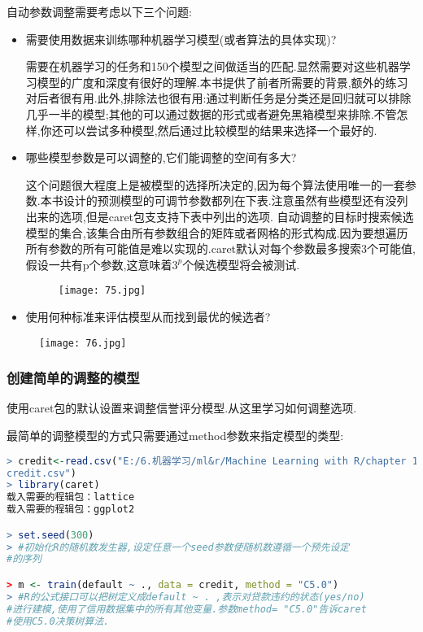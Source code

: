 \documentclass[11pt,a4paper,oneside]{book}
\begin{document}
自动参数调整需要考虑以下三个问题:
\begin{itemize}
	\item 需要使用数据来训练哪种机器学习模型(或者算法的具体实现)?
	\begin{tcolorbox}[colback=blue!7!white,colframe=blue!40]
	需要在机器学习的任务和150个模型之间做适当的匹配.显然需要对这些机器学习模型的广度和深度有很好的理解.本书提供了前者所需要的背景,额外的练习对后者很有用.此外,排除法也很有用:通过判断任务是分类还是回归就可以排除几乎一半的模型;其他的可以通过数据的形式或者避免黑箱模型来排除.不管怎样,你还可以尝试多种模型,然后通过比较模型的结果来选择一个最好的.
	\end{tcolorbox}
	\item 哪些模型参数是可以调整的,它们能调整的空间有多大?
	\begin{tcolorbox}[colback=blue!7!white,colframe=blue!40]
	这个问题很大程度上是被模型的选择所决定的,因为每个算法使用唯一的一套参数.本书设计的预测模型的可调节参数都列在下表.注意虽然有些模型还有没列出来的选项,但是caret包支支持下表中列出的选项.
	自动调整的目标时搜索候选模型的集合,该集合由所有参数组合的矩阵或者网格的形式构成.因为要想遍历所有参数的所有可能值是难以实现的.caret默认对每个参数最多搜索3个可能值,假设一共有p个参数,这意味着$ 3^p $个候选模型将会被测试.
	\end{tcolorbox}
	\begin{figure}[H]
	\centering
	\texttt{[image: 75.jpg]}
\end{figure}
	\item 使用何种标准来评估模型从而找到最优的候选者?
\end{itemize}
\begin{figure}[H]
	\centering
	\texttt{[image: 76.jpg]}
\end{figure}

\subsubsection{创建简单的调整的模型}
使用caret包的默认设置来调整信誉评分模型.从这里学习如何调整选项.

最简单的调整模型的方式只需要通过method参数来指定模型的类型:
\begin{lstlisting}[language=r]
> credit<-read.csv("E:/6.机器学习/ml&r/Machine Learning with R/chapter 11/
credit.csv")
> library(caret)
载入需要的程辑包：lattice
载入需要的程辑包：ggplot2

> set.seed(300) 
> #初始化R的随机数发生器,设定任意一个seed参数使随机数遵循一个预先设定
#的序列

> m <- train(default ~ ., data = credit, method = "C5.0")
> #R的公式接口可以把树定义成default ~ . ,表示对贷款违约的状态(yes/no)
#进行建模,使用了信用数据集中的所有其他变量.参数method= "C5.0"告诉caret
#使用C5.0决策树算法.
\end{lstlisting}
\end{document}
